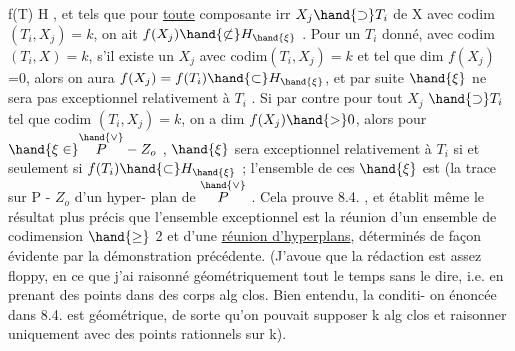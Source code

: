  f(T) \hand{$\subset$} H , et tels que pour \uline{toute} composante irr $X_j \hand{\supset} T_i$ de X
avec codim $(T_i,X_j)=k$, on ait $f(X_j)\hand{\not\subset} H_{\hand{\xi}}$ . Pour un $T_i$ donné,
 avec codim$(T_i,X)=k$, s'il existe un $X_j$ avec codim$(T_i,X_j)=k$
et tel que dim $f(X_j)$ =0, alors 
 on aura $f(X_j) = f(T_i) \hand{\subset} H_{\hand{\xi}}$, et par suite $\hand{\xi}$ ne
sera pas exceptionnel relativement à $T_i$ . Si par contre pour tout $X_j$
$\hand{\supset} T_i$ tel que codim $(T_i,X_j) = k$, on a dim $f(X_j) \hand{>} 0$, alors pour
$\hand{\xi \in} \overset{\hand{\vee}}{P} - Z_o$ , $\hand{\xi}$ sera exceptionnel relativement à $T_i$ si et seulement si
$f(T_i) \hand{\subset} H_{\hand{\xi}}$ ; l'ensemble de ces $\hand{\xi}$ est (la trace sur P - $Z_o$ d'\hand{)}un hyper-
plan de $\overset{\hand{\vee}}{P}$ . Cela prouve 8.4. , et établit même le résultat plus précis
que l'ensemble exceptionnel est la réunion d'un ensemble de codimension
$\hand{\geq}$ 2 et d'une \uline{réunion d'hyperplans}, déterminés de façon évidente par la
démonstration précédente. (J'avoue que la rédaction est assez floppy, 
en ce que j'ai raisonné géométriquement tout le temps sans le dire, i.e.
en prenant des points dans des corps alg clos. Bien entendu, la conditi-
on énoncée dans 8.4. est  géométrique, de sorte qu'on pouvait supposer
k alg clos et raisonner uniquement avec des points rationnels sur k).

